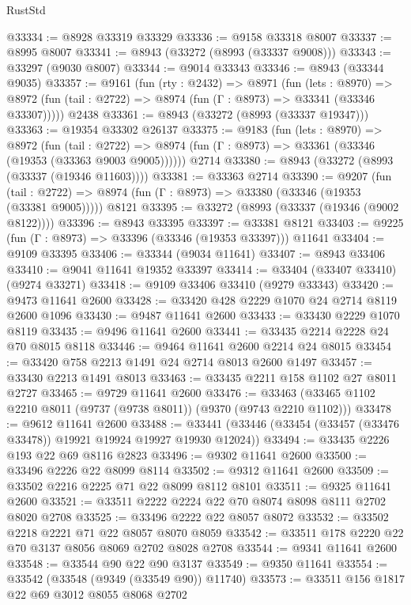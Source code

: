 \begin{lexlean}{RustStd}
\begin{coremodule}
@33334 := @8928 @33319 @33329
@33336 := @9158 @33318 @8007
@33337 := @8995 @8007
@33341 := @8943 (@33272 (@8993 (@33337 @9008)))
@33343 := @33297 (@9030 @8007)
@33344 := @9014 @33343
@33346 := @8943 (@33344 @9035)
@33357 := @9161
    (fun (rty : @2432) =>
    @8971
      (fun (lets : @8970) =>
      @8972 (fun (tail : @2722) => @8974 (fun (Γ : @8973) => @33341 (@33346 @33307)))))
    @2438
@33361 := @8943 (@33272 (@8993 (@33337 @19347)))
@33363 := @19354 @33302 @26137
@33375 := @9183
    (fun (lets : @8970) =>
    @8972
      (fun (tail : @2722) =>
      @8974 (fun (Γ : @8973) => @33361 (@33346 (@19353 (@33363 @9003 @9005))))))
    @2714
@33380 := @8943 (@33272 (@8993 (@33337 (@19346 @11603))))
@33381 := @33363 @2714
@33390 := @9207
    (fun (tail : @2722) => @8974 (fun (Γ : @8973) => @33380 (@33346 (@19353 (@33381 @9005)))))
    @8121
@33395 := @33272 (@8993 (@33337 (@19346 (@9002 @8122))))
@33396 := @8943 @33395
@33397 := @33381 @8121
@33403 := @9225 (fun (Γ : @8973) => @33396 (@33346 (@19353 @33397))) @11641
@33404 := @9109 @33395
@33406 := @33344 (@9034 @11641)
@33407 := @8943 @33406
@33410 := @9041 @11641 @19352 @33397
@33414 := @33404 (@33407 @33410) (@9274 @33271)
@33418 := @9109 @33406 @33410 (@9279 @33343)
@33420 := @9473 @11641 @2600
@33428 := @33420 @428 @2229 @1070 @24 @2714 @8119 @2600 @1096
@33430 := @9487 @11641 @2600
@33433 := @33430 @2229 @1070 @8119
@33435 := @9496 @11641 @2600
@33441 := @33435 @2214 @2228 @24 @70 @8015 @8118
@33446 := @9464 @11641 @2600 @2214 @24 @8015
@33454 := @33420 @758 @2213 @1491 @24 @2714 @8013 @2600 @1497
@33457 := @33430 @2213 @1491 @8013
@33463 := @33435 @2211 @158 @1102 @27 @8011 @2727
@33465 := @9729 @11641 @2600
@33476 := @33463 (@33465 @1102 @2210 @8011 (@9737 (@9738 @8011)) (@9370 (@9743 @2210 @1102)))
@33478 := @9612 @11641 @2600
@33488 := @33441 (@33446 (@33454 (@33457 (@33476 @33478)) @19921 @19924 @19927 @19930 @12024))
@33494 := @33435 @2226 @193 @22 @69 @8116 @2823
@33496 := @9302 @11641 @2600
@33500 := @33496 @2226 @22 @8099 @8114
@33502 := @9312 @11641 @2600
@33509 := @33502 @2216 @2225 @71 @22 @8099 @8112 @8101
@33511 := @9325 @11641 @2600
@33521 := @33511 @2222 @2224 @22 @70 @8074 @8098 @8111 @2702 @8020 @2708
@33525 := @33496 @2222 @22 @8057 @8072
@33532 := @33502 @2218 @2221 @71 @22 @8057 @8070 @8059
@33542 := @33511 @178 @2220 @22 @70 @3137 @8056 @8069 @2702 @8028 @2708
@33544 := @9341 @11641 @2600
@33548 := @33544 @90 @22 @90 @3137
@33549 := @9350 @11641
@33554 := @33542 (@33548 (@9349 (@33549 @90)) @11740)
@33573 := @33511
    @156
    @1817
    @22
    @69
    @3012
    @8055
    @8068
    @2702

\end{coremodule}
\end{lexlean}
